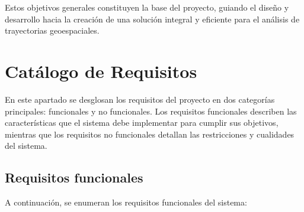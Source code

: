 Estos objetivos generales constituyen la base del proyecto, guiando el diseño y desarrollo hacia la creación de una solución integral y eficiente para el análisis de trayectorias geoespaciales.

\section{Catálogo de Requisitos}

En este apartado se desglosan los requisitos del proyecto en dos categorías principales: funcionales y no funcionales. Los requisitos funcionales describen las características que el sistema debe implementar para cumplir sus objetivos, mientras que los requisitos no funcionales detallan las restricciones y cualidades del sistema.

\subsection{Requisitos funcionales}

A continuación, se enumeran los requisitos funcionales del sistema:

